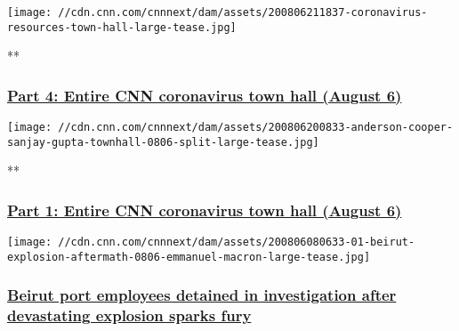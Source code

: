 \texttt{[image: //cdn.cnn.com/cnnnext/dam/assets/200806211837-coronavirus-resources-town-hall-large-tease.jpg]}

**

\hypertarget{part-4-entire-cnn-coronavirus-town-hall-august-6}{%
\subsubsection{\texorpdfstring{\href{/videos/health/2020/08/06/entire-august-6-coronavirus-town-hall-part-4-sot-vpx.cnn}{Part
4: Entire CNN coronavirus town hall (August
6)}}{Part 4: Entire CNN coronavirus town hall (August 6)}}\label{part-4-entire-cnn-coronavirus-town-hall-august-6}}

\href{/videos/health/2020/08/06/entire-august-6-coronavirus-town-hall-part-1-sot-vpx.cnn}{}

\texttt{[image: //cdn.cnn.com/cnnnext/dam/assets/200806200833-anderson-cooper-sanjay-gupta-townhall-0806-split-large-tease.jpg]}

**

\hypertarget{part-1-entire-cnn-coronavirus-town-hall-august-6}{%
\subsubsection{\texorpdfstring{\href{/videos/health/2020/08/06/entire-august-6-coronavirus-town-hall-part-1-sot-vpx.cnn}{Part
1: Entire CNN coronavirus town hall (August
6)}}{Part 1: Entire CNN coronavirus town hall (August 6)}}\label{part-1-entire-cnn-coronavirus-town-hall-august-6}}

\href{/2020/08/06/middleeast/beirut-explosion-anger-intl-hnk/index.html}{}

\texttt{[image: //cdn.cnn.com/cnnnext/dam/assets/200806080633-01-beirut-explosion-aftermath-0806-emmanuel-macron-large-tease.jpg]}

\hypertarget{beirut-port-employees-detained-in-investigation-after-devastating-explosion-sparks-fury-1}{%
\subsubsection{\texorpdfstring{\href{/2020/08/06/middleeast/beirut-explosion-anger-intl-hnk/index.html}{Beirut
port employees detained in investigation after devastating explosion
sparks
fury}}{Beirut port employees detained in investigation after devastating explosion sparks fury}}\label{beirut-port-employees-detained-in-investigation-after-devastating-explosion-sparks-fury-1}}

